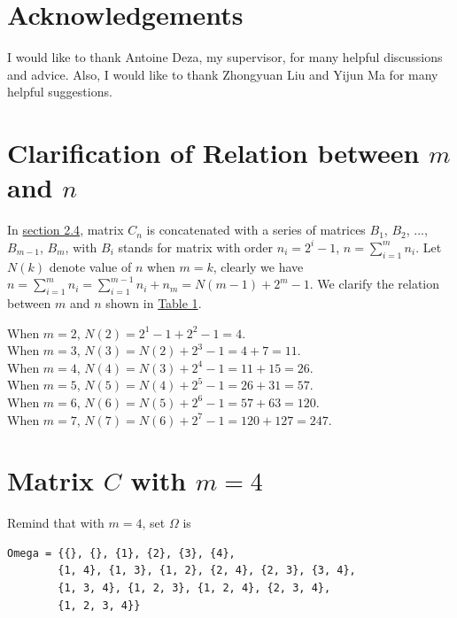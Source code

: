\documentclass[11pt]{article}
\begin{document}
\section{Acknowledgements}
I would like to thank Antoine Deza, my supervisor, for many helpful discussions and advice. Also, I would like to thank Zhongyuan Liu and Yijun Ma for many helpful suggestions.

\newpage




\newpage
\appendix
\renewcommand{\thesection}{\Alph{section}.\arabic{section}}
\setcounter{section}{0}

\begin{appendices}
\section*{Clarification of Relation between $m$ and $n$}\label{appe:clarifynm}
In \hyperref[section2.4]{section 2.4}, matrix $C_n$ is concatenated with a series of matrices $B_1$, $B_2$, ..., $B_{m-1}$, $B_{m}$, with $B_i$ stands for matrix with order $n_i = 2^i - 1$, $n = \sum_{i=1}^{m}n_i$. Let $N(k)$ denote value of $n$ when $m=k$, clearly we have $n = \sum_{i=1}^{m}n_i = \sum_{i=1}^{m - 1}n_i + n_m = N(m-1) + 2^m - 1$. We clarify the relation between $m$ and $n$ shown in \hyperref[table:1]{Table 1}.

When $m = 2$, $N(2) = 2^1 - 1 + 2^2 - 1 = 4$.\\
When $m = 3$, $N(3) = N(2) + 2^3 - 1 = 4 + 7 = 11$.\\
When $m = 4$, $N(4) = N(3) + 2^4 - 1 = 11 + 15 = 26$.\\
When $m = 5$, $N(5) = N(4) + 2^5 - 1 = 26 + 31 = 57$.\\
When $m = 6$, $N(6) = N(5) + 2^6 - 1 = 57 + 63 = 120$.\\
When $m = 7$, $N(7) = N(6) + 2^7 - 1 = 120 + 127 = 247$.\\

\newpage
\section*{Matrix $C$ with $m=4$}\label{appe:matrix_c}
Remind that with $m=4$, set $\Omega$ is
\begin{lstlisting}
Omega = {{}, {}, {1}, {2}, {3}, {4}, 
        {1, 4}, {1, 3}, {1, 2}, {2, 4}, {2, 3}, {3, 4}, 
        {1, 3, 4}, {1, 2, 3}, {1, 2, 4}, {2, 3, 4}, 
        {1, 2, 3, 4}}
\end{lstlisting}


\end{appendices}
\end{document}
